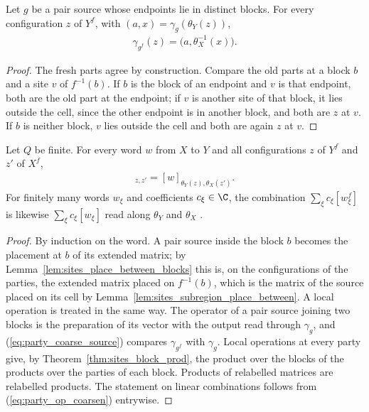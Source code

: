 \begin{theorem}
    \label{thm:party_coarse_source}
    \leanok
    Let $g$ be a pair source whose endpoints lie in distinct blocks. For every
    configuration $z$ of $Y^f$, with $(a,x)=\gamma_g(\theta_Y(z))$,
    \begin{align}
        \gamma_{g^f}(z)=\bigl(a,\theta_X^{-1}(x)\bigr).
        \label{eq:party_coarse_source}
    \end{align}
\end{theorem}
\begin{proof}\leanok
    The fresh parts agree by construction. Compare the old parts at a block $b$ and a
    site $v$ of $f^{-1}(b)$. If $b$ is the block of an endpoint and $v$ is that
    endpoint, both are the old part at the endpoint; if $v$ is another site of that
    block, it lies outside the cell, since the other endpoint is in another block, and
    both are $z$ at $v$. If $b$ is neither block, $v$ lies outside the cell and both
    are again $z$ at $v$.
\end{proof}

\begin{theorem}
    \label{thm:party_op_coarsen}
    \leanok
    Let $Q$ be finite. For every word $w$ from $X$ to $Y$ and all configurations $z$
    of $Y^f$ and $z'$ of $X^f$,
    \begin{align}
        [w^f]_{z,z'}=[w]_{\theta_Y(z),\theta_X(z')}.
        \label{eq:party_op_coarsen}
    \end{align}
    For finitely many words $w_\xi$ and coefficients $c_\xi\in\C$, the combination
    $\sum_\xi c_\xi[w_\xi^f]$ is likewise $\sum_\xi c_\xi[w_\xi]$ read along
    $\theta_Y$ and $\theta_X$ \cite[Theorem~5.2]{OpenAI2026PolynomialPEPS}.
\end{theorem}
\begin{proof}\leanok
    By induction on the word. A pair source inside the block $b$ becomes the placement
    at $b$ of its extended matrix; by Lemma~\ref{lem:sites_place_between_blocks} this
    is, on the configurations of the parties, the extended matrix placed on $f^{-1}(b)$,
    which is the matrix of the source placed on its cell by
    Lemma~\ref{lem:sites_subregion_place_between}. A local operation is treated in the
    same way. The operator of a pair source joining two blocks is the preparation of
    its vector with the output read through $\gamma_g$, and
    (\ref{eq:party_coarse_source}) compares $\gamma_{g^f}$ with $\gamma_g$. Local
    operations at every party give, by Theorem~\ref{thm:sites_block_prod}, the product
    over the blocks of the products over the parties of each block. Products of
    relabelled matrices are relabelled products. The statement on linear combinations
    follows from (\ref{eq:party_op_coarsen}) entrywise.
\end{proof}

